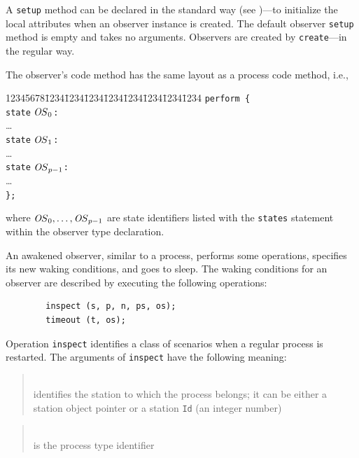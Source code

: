 A {\tt setup} method can be declared in the standard way
(see )---to initialize the local attributes when an
observer instance is created.
The default observer {\tt setup} method is empty and takes no arguments.
Observers are created by {\tt create}---in the regular way.

The observer's code method has the same layout as a process code method, i.e.,
{\tt\begin{tabbing}
12345678\=1234\=1234\=1234\=1234\=1234\=1234\=1234\=1234\kill
\> {\tt perform \{} \\
\> \> {\tt state} ${\textit OS}_0${\tt :} \\
\> \> \> \ldots \\
\> \> {\tt state} ${\textit OS}_1${\tt :} \\
\> \> \> \ldots \\
\> \> {\tt state} ${\textit OS}_{p-1}${\tt :} \\
\> \> \> \ldots \\
\> {\tt \};}
\end{tabbing}}
where ${\textit OS}_0,\ldots ,{\textit OS}_{p-1}$
are state identifiers listed with the
{\tt states} statement within the observer type declaration.

An awakened observer, similar to a process, performs some
operations, specifies its new waking conditions, and goes to sleep.
The waking conditions for an observer are described by executing
the following operations:
\begin{verbatim}
        inspect (s, p, n, ps, os);
        timeout (t, os);
\end{verbatim}

Operation {\tt inspect} identifies a class of scenarios when a regular process
is restarted.
The arguments of {\tt inspect} have the following meaning:

\medskip

\begin{quote}
\noindent{}\\ \hspace{0in}
identifies the station to which the process belongs;
it can be either a station object pointer or a station {\tt Id} (an integer
number)
\end{quote}

\begin{quote}
\noindent{}\\ \hspace{0in}
is the process type identifier
\end{quote}

